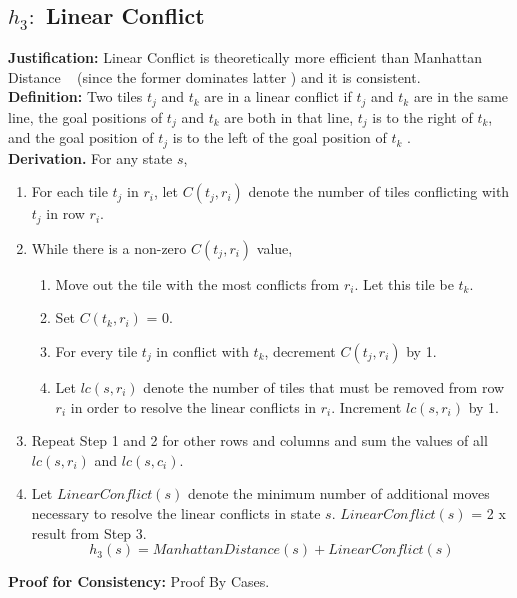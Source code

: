 \documentclass[runningheads]{llncs}
\begin{document}
\subsection{ \(h_3: \) Linear Conflict}
\textbf{Justification:} Linear Conflict is theoretically more efficient than Manhattan Distance ~\cite[p104]{stuart_russell_artifical_2010} (since the former dominates latter \cite[p25]{othar_hansson_generating_1985} ) and it is consistent. \\
\textbf{Definition:} Two tiles \( t_j \) and \( t_k \) are in a linear conflict if \( t_j \) and \( t_k \) are in the same line, 
the goal positions of \( t_j \) and \( t_k \) are both in that line, 
\( t_j \) is to the right of \( t_k \), and the goal position of \( t_j \) is to the left of the goal position of \( t_k \) \cite[p13]{othar_hansson_generating_1985}. \\
\textbf{Derivation.} For any state \( s \),
\begin{enumerate}
    \item For each tile \( t_j \) in \( r_i \), let \( C(t_j, r_i) \) denote the number of tiles conflicting with \( t_j \) in row \( r_i \).
    \item While there is a non-zero \( C(t_j, r_i) \) value,
    \begin{enumerate}
        \item Move out the tile with the most conflicts from \( r_i \). Let this tile be \( t_k \).
        \item Set \( C(t_k, r_i) \) = 0.
        \item For every tile \( t_j \) in conflict with \( t_k \), decrement \( C(t_j, r_i) \) by 1.
        \item Let \( lc(s, r_i) \) denote the number of tiles that must be removed from row \( r_i \) in order to resolve the linear conflicts in \( r_i \). Increment \( lc(s, r_i) \) by 1.
    \end{enumerate}
    \item Repeat Step 1 and 2 for other rows and columns and sum the values of all \( lc (s, r_i) \) and \( lc(s, c_i) \).
    \item Let \( LinearConflict(s) \) denote the minimum number of additional moves necessary to resolve the linear conflicts in state \( s \). \( LinearConflict(s) \) = 2 x result from Step 3.
    \[
        h_3(s) = ManhattanDistance(s) + LinearConflict(s)
    \]
\end{enumerate}
\textbf{Proof for Consistency:} Proof By Cases. \\
\end{document}
